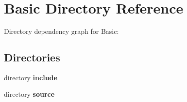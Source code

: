 \section{Basic Directory Reference}
\label{dir_0250b7d4cb11169e771697a58a5a514c}
Directory dependency graph for Basic\-:
\subsection*{Directories}
\begin{DoxyCompactItemize}
\item 
directory {\bf include}
\item 
directory {\bf source}
\end{DoxyCompactItemize}
